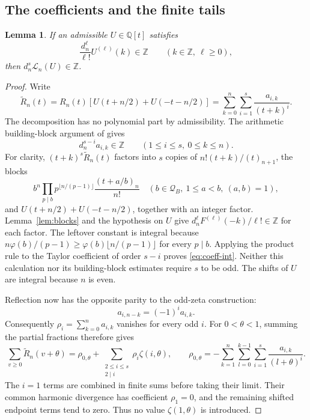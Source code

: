 \documentclass[11pt]{article}
\newtheorem{lemma}[theorem]{Lemma}
\theoremstyle{remark}
\newcommand{\Z}{\mathbb Z}
\newcommand{\Q}{\mathbb Q}
\newcommand{\Lcal}{\mathcal L}
\numberwithin{equation}{section}
\begin{document}
\subsection{The coefficients and the finite tails}

\begin{lemma}\label{lem:arithmetic}
If an admissible $U\in\Q[t]$ satisfies
\begin{equation}\label{eq:derivative-integrality}
 \frac{d_n^\ell}{\ell!}U^{(\ell)}(k)\in\Z
 \qquad(k\in\Z,\ \ell\geq0),
\end{equation}
then $d_n^s\Lcal_n(U)\in\Z$.
\end{lemma}
\begin{proof}
Write
\[
 \widetilde R_n(t)=R_n(t)\left[U(t+n/2)+U(-t-n/2)\right]
   =\sum_{k=0}^n\sum_{i=1}^s\frac{a_{i,k}}{(t+k)^i}.
\]
The decomposition has no polynomial part by admissibility. The arithmetic
building-block argument of \cite[(3.5)--(3.6)]{FLSZ} gives
\begin{equation}\label{eq:coeff-int}
 d_n^{s-i}a_{i,k}\in\Z\qquad(1\leq i\leq s,\ 0\leq k\leq n).
\end{equation}
For clarity, $(t+k)^s\widetilde R_n(t)$ factors into $s$ copies of
$n!(t+k)/(t)_{n+1}$, the blocks
\[
 b^n\prod_{p\mid b}p^{\lfloor n/(p-1)\rfloor}
       \frac{(t+a/b)_n}{n!}
 \quad(b\in\mathcal Q_B,\ 1\leq a<b,\ (a,b)=1),
\]
and $U(t+n/2)+U(-t-n/2)$, together with an integer factor.
Lemma~\ref{lem:blocks} and the hypothesis on $U$ give
$d_n^\ell F^{(\ell)}(-k)/\ell!\in\Z$ for each factor.
The leftover constant is integral because
$n\varphi(b)/(p-1)\geq\varphi(b)\lfloor n/(p-1)\rfloor$ for every
$p\mid b$. Applying the product rule
to the Taylor coefficient of order $s-i$ proves \eqref{eq:coeff-int}.
Neither this calculation nor its building-block estimates require $s$ to
be odd. The shifts of $U$ are integral because $n$ is even.

Reflection now has the opposite parity to the odd-zeta construction:
\[
 a_{i,n-k}=(-1)^i a_{i,k}.
\]
Consequently $\rho_i=\sum_{k=0}^n a_{i,k}$ vanishes for every odd $i$.
For $0<\theta<1$, summing the partial fractions therefore gives
\begin{equation}\label{eq:hurwitz-expansion}
 \sum_{v\geq0}\widetilde R_n(v+\theta)
 =\rho_{0,\theta}+\sum_{\substack{2\leq i\leq s\\2\mid i}}
       \rho_i\zeta(i,\theta),\qquad
 \rho_{0,\theta}=-\sum_{k=1}^n\sum_{l=0}^{k-1}
                    \sum_{i=1}^s\frac{a_{i,k}}{(l+\theta)^i}.
\end{equation}
The $i=1$ terms are combined in finite sums before taking their limit.
Their common harmonic divergence has coefficient $\rho_1=0$, and the
remaining shifted endpoint terms tend to zero. Thus no value
$\zeta(1,\theta)$ is introduced.


\end{proof}
\end{document}

